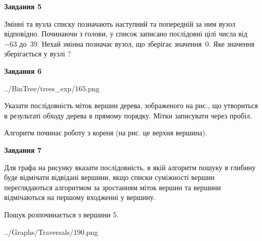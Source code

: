 \documentclass[12pt, ukrainian]{article}
\begin{document}
{\begin {large}
{\begin {center}\textbf{Завдання 5}\end {center}}\par
Змінні  та  вузла списку позначають наступний та попередній за ним вузол відповідно. Починаючи з голови, у список записано послідовні цілі числа від~$-63$ до~$39$. Нехай змінна  позначає вузол, що зберігає значення~$0$.
Яке значення зберігається у вузлі  ?\par
\newpage

{\begin {center}\textbf{Завдання 6}\end {center}}\par

\begin{center}
	{../BinTree/trees_exp/165.png}
\end{center}
Указати послідовність міток вершин дерева, зображеного на рис., що утвориться в результаті обходу дерева в прямому порядку. Мітки записувати через пробіл.\par Алгоритм починає роботу з кореня (на рис. це верхня вершина).\par
\newpage

{\begin {center}\textbf{Завдання 7}\end {center}}\par
Для графа на рисунку вказати послідовність, в якій алгоритм пошуку в глибину буде відмічати відвідані вершини, якщо списки суміжності вершин переглядаються алгоритмом за зростанням міток вершин та вершини відмічаються на першому вход\-женні у вершину.\par
Пошук розпочинається з вершини 5.\par

\begin{center}
	{../Graphs/Traversals/190.png}
\end{center}\par
\newpage


\end{large}}
\end{document}
